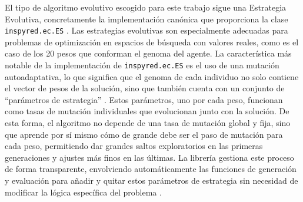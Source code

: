 El tipo de algoritmo evolutivo escogido para este trabajo sigue una Estrategia Evolutiva, concretamente la implementación canónica que proporciona la clase \texttt{inspyred.ec.ES} \cite{aaron_garret_library_2025}. Las estrategias evolutivas son especialmente adecuadas para problemas de optimización en espacios de búsqueda con valores reales, como es el caso de los 20 pesos que conforman el genoma del agente. La característica más notable de la implementación de \texttt{inspyred.ec.ES} es el uso de una mutación autoadaptativa, lo que significa que el genoma de cada individuo no solo contiene el vector de pesos de la solución, sino que también cuenta con un conjunto de ``parámetros de estrategia'' \cite{aaron_garret_library_2025}. Estos parámetros, uno por cada peso, funcionan como tasas de mutación individuales que evolucionan junto con la solución. De esta forma, el algoritmo no depende de una tasa de mutación global y fija, sino que aprende por sí mismo cómo de grande debe ser el paso de mutación para cada peso, permitiendo dar grandes saltos exploratorios en las primeras generaciones y ajustes más finos en las últimas. La librería gestiona este proceso de forma transparente, envolviendo automáticamente las funciones de generación y evaluación para añadir y quitar estos parámetros de estrategia sin necesidad de modificar la lógica específica del problema \cite{aaron_garret_library_2025}.

